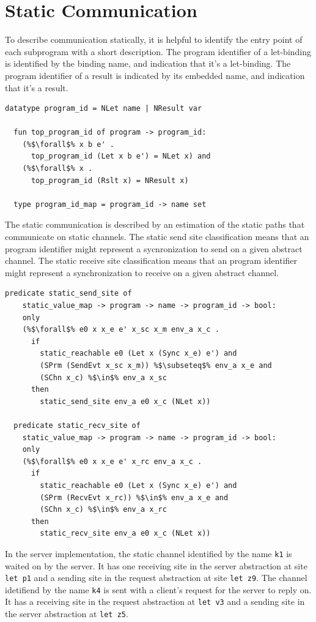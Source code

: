 \documentclass{article}
\begin{document}
\section{Static Communication}
To describe communication statically, it is helpful to identify the entry
point of each subprogram with a short description. The program identifier of a let-binding is
identified by the binding name, and indication that it's a let-binding. The program identifier
of a result is indicated by its embedded name, and indication that it's a result.

\begin{lstlisting}[language=logic, escapechar=\%]
  datatype program_id = NLet name | NResult var

  fun top_program_id of program -> program_id:
    (%$\forall$% x b e' . 
      top_program_id (Let x b e') = NLet x) and
    (%$\forall$% x . 
      top_program_id (Rslt x) = NResult x)

  type program_id_map = program_id -> name set

\end{lstlisting}

The static communication is described by an estimation of the static paths that communicate on
static channels.
The static send site classification means that an program identifier might represent a
sycnronization to send on a given abstract channel.
The static receive site classification means that an program identifier might represent a
synchronization to receive on a given abstract channel. 

\begin{lstlisting}[language=logic, escapechar=\%]
  predicate static_send_site of
    static_value_map -> program -> name -> program_id -> bool:
    only
    (%$\forall$% e0 x x_e e' x_sc x_m env_a x_c .
      if
        static_reachable e0 (Let x (Sync x_e) e') and
        (SPrm (SendEvt x_sc x_m)) %$\subseteq$% env_a x_e and 
        (SChn x_c) %$\in$% env_a x_sc
      then
        static_send_site env_a e0 x_c (NLet x))

  predicate static_recv_site of
    static_value_map -> program -> name -> program_id -> bool:
    only
    (%$\forall$% e0 x x_e e' x_rc env_a x_c .
      if
        static_reachable e0 (Let x (Sync x_e) e') and
        (SPrm (RecvEvt x_rc)) %$\in$% env_a x_e and 
        (SChn x_c) %$\in$% env_a x_rc 
      then
        static_recv_site env_a e0 x_c (NLet x))
  \end{lstlisting}


In the server implementation, the static channel identified by the name \lstinline{k1} is waited on
by the server.  It has
one receiving site in the server abstraction
at site \lstinline[language=sugar_lang]{let p1} and a sending site
in the request abstraction at site \lstinline[language=sugar_lang]{let z9}.
The channel idetifiend by the name \lstinline{k4} is sent with a client's request for
the server to reply on. It has a receiving site in the request abstraction at
\lstinline[language=sugar_lang]{let v3} and a sending site in the server abstraction at
\lstinline[language=sugar_lang]{let z5}.
\end{document}
